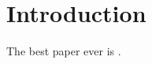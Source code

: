 \section{Introduction}
\label{sec:intro}


The best paper ever is \citealp{singleton2021geographic}.